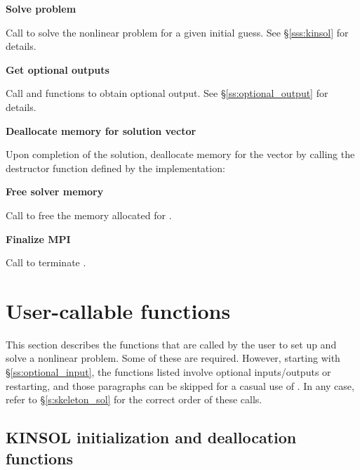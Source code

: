 \begin{Steps}
\item
  {\bf Solve problem}

  Call  to solve the nonlinear problem for a given
  initial guess. See \S\ref{sss:kinsol} for details.

\item
  {\bf Get optional outputs}

  Call  and  functions to obtain optional output.
  See \S\ref{ss:optional_output} for details.

\item
  {\bf Deallocate memory for solution vector}

  Upon completion of the solution, deallocate memory for the vector 
  by calling the destructor function defined by the {\nvector} implementation:

  {\s} 

  {\p} 
  
\item
  {\bf Free solver memory}

  Call  to free the memory allocated for {\kinsol}.
  
\item 
  {\bf {\p} Finalize MPI}

  Call  to terminate {\mpi}.
  
\end{Steps}


\section{User-callable functions}\label{s:kinsol_fct_sol}

This section describes the {\kinsol} functions that are called by the
user to set up and solve a nonlinear problem. Some of these are required. However,
starting with \S\ref{ss:optional_input}, the functions listed involve
optional inputs/outputs or restarting, and those paragraphs can be
skipped for a casual use of {\kinsol}. In any case, refer to
\S\ref{s:skeleton_sol} for the correct order of these calls.


\subsection{KINSOL initialization and deallocation functions}
\label{sss:kinmalloc}

